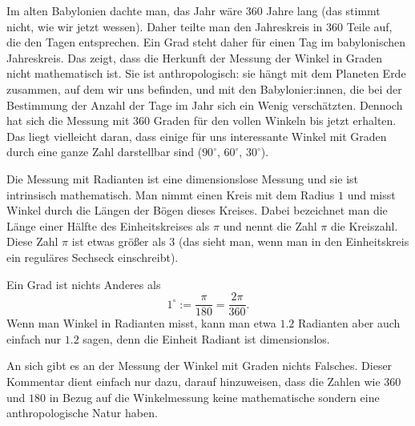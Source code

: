\begin{bem} 
	Im alten Babylonien dachte man, das Jahr wäre 360 Jahre lang (das stimmt nicht, wie wir jetzt wessen). Daher teilte man den Jahreskreis in 360 Teile auf, die den Tagen entsprechen. Ein Grad steht daher für einen Tag im babylonischen Jahreskreis. Das zeigt, dass die Herkunft der Messung der Winkel in Graden nicht mathematisch ist. Sie ist anthropologisch: sie hängt mit dem Planeten Erde zusammen, auf dem wir uns befinden, und mit den Babylonier:innen, die bei der Bestimmung der Anzahl der Tage im Jahr sich ein Wenig verschätzten. Dennoch hat sich die Messung mit 360 Graden für den vollen Winkeln bis jetzt erhalten. Das liegt vielleicht daran, dass einige für uns interessante Winkel mit Graden durch eine ganze Zahl darstellbar sind ($90^\circ$, $60^\circ$, $30^\circ$). 
	
	Die Messung mit Radianten ist eine dimensionslose Messung und sie ist intrinsisch mathematisch. Man nimmt einen Kreis mit dem Radius $1$ und misst Winkel durch die Längen der Bögen dieses Kreises. Dabei bezeichnet man die Länge einer Hälfte des Einheitskreises als $\pi$ und nennt die Zahl $\pi$ die Kreiszahl. Diese Zahl $\pi$ ist etwas größer als $3$ (das sieht man, wenn man in den Einheitskreis ein reguläres Sechseck einschreibt). 
	
	Ein Grad ist nichts Anderes als 
	\[
		1^\circ := \frac{\pi}{180}= \frac{2\pi}{360}.
	\] Wenn man Winkel in Radianten misst, kann man etwa $1{.}2$ Radianten aber auch einfach nur $1{.}2$ sagen, denn die Einheit Radiant ist dimensionslos. 
	
	An sich gibt es an der Messung der Winkel mit Graden nichts Falsches. Dieser Kommentar dient einfach nur dazu, darauf hinzuweisen, dass die Zahlen wie $360$ und $180$ in Bezug auf die Winkelmessung keine mathematische sondern eine anthropologische Natur haben.
\end{bem} 

